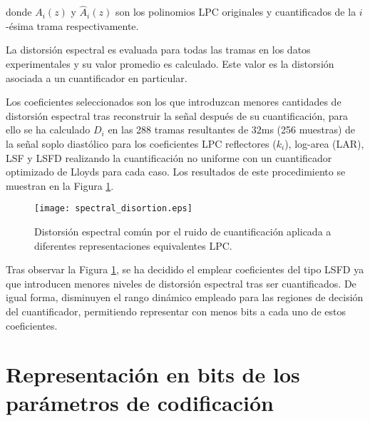 donde $A_{i}(z)$ y $\widehat{A}_{i}(z)$ son los polinomios LPC originales y cuantificados de la $i$-ésima trama respectivamente. 

La distorsión espectral es evaluada para todas las tramas en los datos experimentales y su valor promedio es calculado. Este valor es la distorsión asociada a un cuantificador en particular.

Los coeficientes seleccionados son los que introduzcan menores cantidades de distorsión espectral tras reconstruir la señal después de su cuantificación, para ello se ha calculado $D_{i}$ en las 288 tramas resultantes de 32ms (256 muestras) de la señal soplo diastólico para los coeficientes LPC reflectores ($k_{i}$), log-area (LAR), LSF y LSFD realizando la cuantificación no uniforme con un cuantificador optimizado de Lloyds para cada caso. Los resultados de este procedimiento se muestran en la Figura \ref{spectrDis}.
\begin{figure}[h!]
  \centering
  \texttt{[image: spectral\_disortion.eps]}
  \caption{Distorsión espectral común por el ruido de cuantificación aplicada a diferentes representaciones equivalentes LPC.}
  \label{spectrDis}
\end{figure}


Tras observar la Figura \ref{spectrDis}, se ha decidido el emplear coeficientes del tipo LSFD ya que introducen menores niveles de distorsión espectral tras ser cuantificados. De igual forma, disminuyen el rango dinámico empleado para las regiones de decisión del cuantificador, permitiendo representar con menos bits a cada uno de estos coeficientes. 

\section{Representación en bits de los parámetros de codificación}

